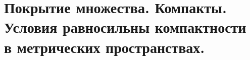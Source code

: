 \documentclass[../main.tex]{subfiles}
\begin{document}
\newpage
\section{Покрытие множества. Компакты. Условия равносильны компактности в метрических пространствах.}
\end{document}
